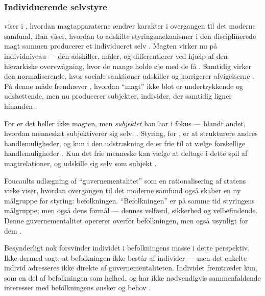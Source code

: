 \subsubsection{Individuerende selvstyre}
\citeauthor{foucaultOvervagningOgStraf2005} viser i , hvordan magtapparaterne ændrer karakter i overgangen til det moderne samfund.
Han viser, hvordan to adskilte styringsmekanismer i den disciplinerede magt sammen producerer et individueret selv \autocite[s. 186]{foucaultOvervagningOgStraf2005}.
Magten virker nu på individniveau — den adskiller, måler, og differentierer ved hjælp af den hierarkiske overvwågning, hvor de mange holde øje med de få \autocite[s. 187ff]{foucaultOvervagningOgStraf2005}.
Samtidig virker den normaliserende, hvor sociale sanktioner udskiller og korrigerer afvigelserne \autocite[s. 194]{foucaultOvervagningOgStraf2005}.
På denne måde fremhæver \citeauthor{foucaultOvervagningOgStraf2005}, hvordan “magt” ikke blot er undertrykkende og udslættende, men nu producerer subjekter, individer, der samtidig ligner hinanden \autocite[s. 198]{foucaultOvervagningOgStraf2005}.

For \citeauthor{foucaultSubjectPower1982} er det heller ikke magten, men \textit{subjektet} han har i fokus — blandt andet, hvordan mennesket subjektiverer sig selv. \autocite[s. 777f]{foucaultSubjectPower1982}.
Styring, for \citeauthor{foucaultSubjectPower1982}, er at strukturere andres handlemuligheder, og kun i den udstrækning de er frie til at vælge forskellige handlemuligheder \autocite[s. 790]{foucaultSubjectPower1982}.
Kun det frie menneske kan vælge at deltage i dette spil af magtrelationer, og udskille sig selv som subjekt \autocite[s. 789]{foucaultSubjectPower1982}.

Foucaults udlægning af “guvernementalitet” som en rationalisering af statens virke viser, hvordan overgangen til det moderne samfund også skaber en ny målgruppe for styring: befolkningen.
“Befolkningen” er på samme tid styringens målgruppe; men også dens formål — dennes velfærd, sikkerhed og velbefindende.
Denne guvernementalitet opererer overfor befolkningen, men også usynligt for dem \autocite[s 216ff]{foucaultGovernmentality2000}.

Besynderligt nok forsvinder individet i befolkningens masse i dette perspektiv.
Ikke dermed sagt, at befolkningen ikke består af individer — men det enkelte individ adresseres ikke direkte af guvernementaliteten.
Individet fremtræder kun, som en del af befolkningen som helhed, og har ikke nødvendigvis sammenfaldende interesser med befolkningens ønsker og behov \autocite[s. 217]{foucaultGovernmentality2000}.

